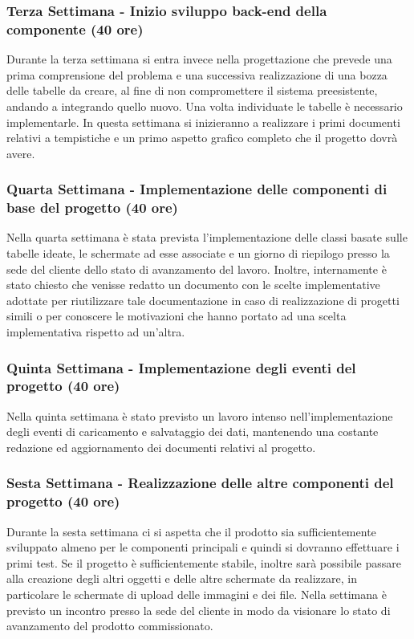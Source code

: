 \subsubsection*{Terza Settimana - Inizio sviluppo back-end della componente (40 ore)}
Durante la terza settimana si entra invece nella progettazione che prevede una prima comprensione del problema e una successiva realizzazione di una bozza delle tabelle da creare, al fine di non compromettere il sistema preesistente, andando a integrando quello nuovo. Una volta individuate le tabelle è necessario implementarle. In questa settimana si inizieranno a realizzare i primi documenti relativi a tempistiche e un primo aspetto grafico completo che il progetto dovrà avere.

\subsubsection*{Quarta Settimana - Implementazione delle componenti di base del progetto  (40 ore)}
Nella quarta settimana è stata prevista l'implementazione delle classi basate sulle tabelle ideate, le schermate ad esse associate e un giorno di riepilogo presso la sede del cliente dello stato di avanzamento del lavoro. Inoltre, internamente è stato chiesto che venisse redatto un documento con le scelte implementative adottate per riutilizzare tale documentazione in caso di realizzazione di progetti simili o per conoscere le motivazioni che hanno portato ad una scelta implementativa rispetto ad un'altra.

\subsubsection*{Quinta Settimana - Implementazione degli eventi del progetto (40 ore)}
Nella quinta settimana è stato previsto un lavoro intenso nell'implementazione degli eventi di caricamento e salvataggio dei dati, mantenendo una costante redazione ed aggiornamento dei documenti relativi al progetto.

\subsubsection*{Sesta Settimana - Realizzazione delle altre componenti del progetto (40 ore)}
Durante la sesta settimana ci si aspetta che il prodotto sia sufficientemente sviluppato almeno per le componenti principali e quindi si dovranno effettuare i primi test. Se il progetto è sufficientemente stabile, inoltre sarà possibile passare alla creazione degli altri oggetti e delle altre schermate da realizzare, in particolare le schermate di upload delle immagini e dei file.
Nella settimana è previsto un incontro presso la sede del cliente in modo da visionare lo stato di avanzamento del prodotto commissionato.

